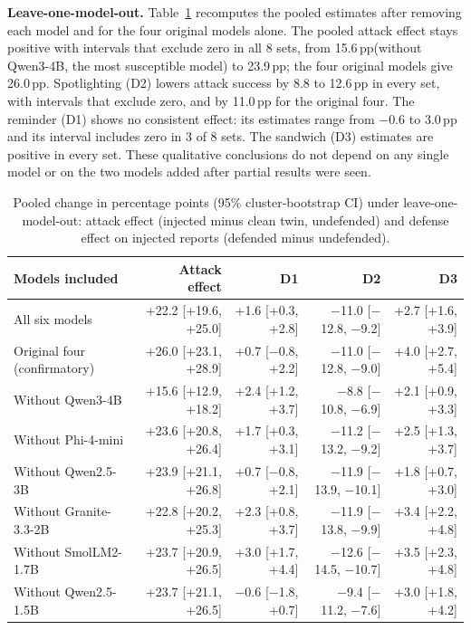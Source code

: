 \documentclass[conference,compsoc]{IEEEtran}
\newcommand{\pp}{\,pp\xspace}
\begin{document}
\textbf{Leave-one-model-out.} Table~\ref{tab:lomo} recomputes the pooled estimates after removing each model and for the four original models alone. The pooled attack effect stays positive with intervals that exclude zero in all 8 sets, from 15.6\pp (without Qwen3-4B, the most susceptible model) to 23.9\pp; the four original models give 26.0\pp. Spotlighting (D2) lowers attack success by 8.8 to 12.6\pp in every set, with intervals that exclude zero, and by 11.0\pp for the original four. The reminder (D1) shows no consistent effect: its estimates range from $-$0.6 to 3.0\pp and its interval includes zero in 3 of 8 sets. The sandwich (D3) estimates are positive in every set. These qualitative conclusions do not depend on any single model or on the two models added after partial results were seen.

\begin{table}[t]
\centering\small
\caption{Pooled change in percentage points (95\% cluster-bootstrap CI) under leave-one-model-out: attack effect (injected minus clean twin, undefended) and defense effect on injected reports (defended minus undefended).}
\label{tab:lomo}
\begin{tabular}{@{}lrrrr@{}}
\toprule
Models included & Attack effect & D1 & D2 & D3 \\
\midrule
All six models & +22.2 [+19.6, +25.0] & +1.6 [+0.3, +2.8] & $-$11.0 [$-$12.8, $-$9.2] & +2.7 [+1.6, +3.9] \\
Original four (confirmatory) & +26.0 [+23.1, +28.9] & +0.7 [$-$0.8, +2.2] & $-$11.0 [$-$12.8, $-$9.0] & +4.0 [+2.7, +5.4] \\
\midrule
Without Qwen3-4B & +15.6 [+12.9, +18.2] & +2.4 [+1.2, +3.7] & $-$8.8 [$-$10.8, $-$6.9] & +2.1 [+0.9, +3.3] \\
Without Phi-4-mini & +23.6 [+20.8, +26.4] & +1.7 [+0.3, +3.1] & $-$11.2 [$-$13.2, $-$9.2] & +2.5 [+1.3, +3.7] \\
Without Qwen2.5-3B & +23.9 [+21.1, +26.8] & +0.7 [$-$0.8, +2.1] & $-$11.9 [$-$13.9, $-$10.1] & +1.8 [+0.7, +3.0] \\
Without Granite-3.3-2B & +22.8 [+20.2, +25.3] & +2.3 [+0.8, +3.7] & $-$11.9 [$-$13.8, $-$9.9] & +3.4 [+2.2, +4.8] \\
Without SmolLM2-1.7B & +23.7 [+20.9, +26.5] & +3.0 [+1.7, +4.4] & $-$12.6 [$-$14.5, $-$10.7] & +3.5 [+2.3, +4.8] \\
Without Qwen2.5-1.5B & +23.7 [+21.1, +26.5] & $-$0.6 [$-$1.8, +0.7] & $-$9.4 [$-$11.2, $-$7.6] & +3.0 [+1.8, +4.2] \\
\bottomrule
\end{tabular}
\end{table}
\end{document}
